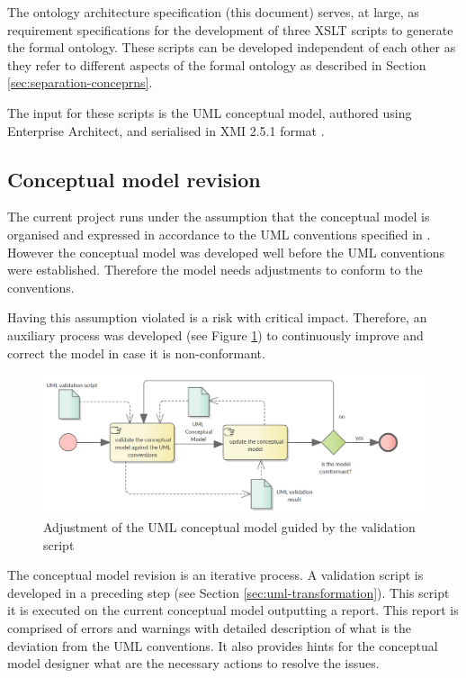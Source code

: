 	The ontology architecture specification (this document) serves, at large, as requirement specifications for the development of three XSLT scripts to generate the formal ontology. These scripts can be developed independent of each other as they refer to different aspects of the formal ontology as described in Section \ref{sec:separation-conceprns}.
	
	The input for these scripts is the UML conceptual model, authored using Enterprise Architect, and serialised in XMI 2.5.1 format \cite{xmi2.5.1}.
	
	\subsection{Conceptual model revision}
	\label{sec:revision-cm}
	
	The current project runs under the assumption that the conceptual model is organised and expressed in accordance to the UML conventions specified in \citep{costetchi2020b}. However the conceptual model was developed well before the UML conventions were established. Therefore the model needs adjustments to conform to the conventions.  
	
	Having this assumption violated is a risk with critical impact. Therefore, an auxiliary process was developed (see Figure \ref{fig:revision-cm}) to continuously improve and correct the model in case it is non-conformant. 
	
	\begin{figure}[!ht]	
		\centering
		\includegraphics[width=.85\textwidth]{../img/conceptualModelRevision.png}
		\caption{Adjustment of the UML conceptual model guided by the validation script}
		\label{fig:revision-cm}
	\end{figure}

	The conceptual model revision is an iterative process. A validation script is developed in a preceding step (see Section \ref{sec:uml-transformation}). This script it is executed on the current conceptual model outputting a report. This report is comprised of errors and warnings with detailed description of what is the deviation from the UML conventions. It also provides hints for the conceptual model designer what are the necessary actions to resolve the issues.
	
